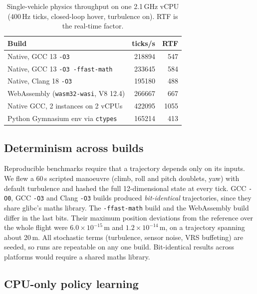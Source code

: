 \documentclass{ieeeaccess}
\begin{document}
\begin{table}[t]
\centering
\caption{Single-vehicle physics throughput on one 2.1\,GHz vCPU (400\,Hz ticks,
closed-loop hover, turbulence on). RTF is the real-time factor.}
\label{tab:perf}
\footnotesize
\begin{tabular}{@{}lrr@{}}
\toprule
Build & ticks/s & RTF \\
\midrule
Native, GCC 13 \texttt{-O3} & \num{218894} & 547 \\
Native, GCC 13 \texttt{-O3 -ffast-math} & \num{233645} & 584 \\
Native, Clang 18 \texttt{-O3} & \num{195180} & 488 \\
WebAssembly (\texttt{wasm32-wasi}, V8 12.4) & \num{266667} & 667 \\
Native GCC, 2 instances on 2 vCPUs & \num{422095} & 1055 \\
Python Gymnasium env via \texttt{ctypes} & \num{165214} & 413 \\
\bottomrule
\end{tabular}
\end{table}

\subsection{Determinism across builds}
\label{sec:det}

Reproducible benchmarks require that a trajectory depends only on its inputs.
We flew a 60\,s scripted manoeuvre (climb, roll and pitch doublets, yaw) with
default turbulence and hashed the full 12-dimensional state at every tick.
GCC \texttt{-O0}, GCC \texttt{-O3} and Clang \texttt{-O3} builds produced
\emph{bit-identical} trajectories, since they share glibc's maths library. The
\texttt{-ffast-math} build and the WebAssembly build differ in the last bits.
Their maximum position deviations from the reference over the whole flight were
$6.0\times10^{-15}$\,m and $1.2\times10^{-14}$\,m, on a trajectory spanning
about 20\,m. All stochastic terms (turbulence, sensor noise, VRS buffeting) are
seeded, so runs are repeatable on any one build. Bit-identical results across
platforms would require a shared maths library.

\subsection{CPU-only policy learning}
\label{sec:rl}
\end{document}
